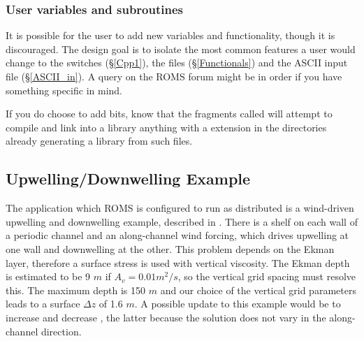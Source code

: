 \subsubsection{User variables and subroutines}
\label{Store}
It is possible for the user to add new variables and functionality,
though it is discouraged. The design goal is to isolate the most common
features a user would change to the  switches
(\S\ref{Cpp1}), the  files (\S\ref{Functionals}) and
the ASCII input file (\S\ref{ASCII_in}). A query on the ROMS forum
might be in order if you have something specific in mind.

If you do choose to add bits, know that the 
fragments called  will attempt to compile and
link into a library anything
with a  extension in the directories already generating a
library from such files.

\subsection{Upwelling/Downwelling Example}
\label{UpDown}
The application which ROMS is configured to run as distributed
is a wind-driven
upwelling and downwelling example, described in
\citet{Macks93}.  There is a shelf on each wall of a periodic channel
and an along-channel wind forcing, which drives upwelling at one wall
and downwelling at the other.  This problem depends on the Ekman layer,
therefore a surface stress is used with vertical viscosity.  The Ekman
depth is estimated to be 9 $m$ if $A_v = 0.01 m^2 / s$, so the vertical
grid spacing must resolve this.  The maximum depth is 150 $m$ and our
choice of the vertical grid parameters leads to a surface $\Delta z$
of 1.6 $m$. A possible update to this example would be to increase
 and decrease , the latter because the solution
does not vary in the along-channel direction.

